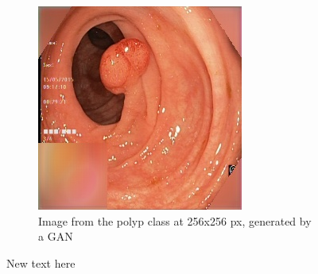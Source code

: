 \begin{figure}[t]
\begin{subfigure}[b]{0.4\textwidth}
            \includegraphics[width=\textwidth]{experiments/figures/both/PGAN.jpg}
            \caption[]%
            {{\small Image from the polyp class at 256x256 px, generated by a GAN }}    
            \label{fig:zGAN}
        \end{subfigure}
        \caption[ ]
        {\small New text here} 
        \label{fig:GC1GREEN}
    \end{figure}
    
